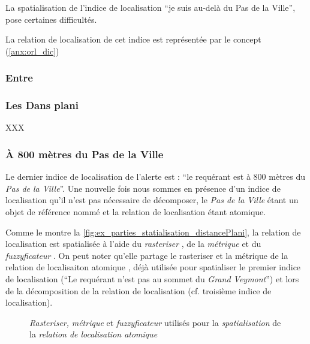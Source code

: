 La spatialisation de l'indice de localisation \enquote{je suis au-delà
  du Pas de la Ville}, pose certaines difficultés.

La relation de localisation de cet indice est représentée par le
concept 
(\autoref{anx:orl_dic})

\subsubsection{Entre}



\subsubsection{Les Dans plani}

XXX





\subsubsection{À 800 mètres du Pas de la Ville}

Le dernier indice de localisation de l'alerte est : \enquote{le
  requérant est à 800 mètres du \emph{Pas de la Ville}}. Une nouvelle
fois nous sommes en présence d'un indice de localisation qu'il n'est
pas nécessaire de décomposer, le \emph{Pas de la Ville} étant un objet
de référence nommé et la relation de localisation
 étant atomique. 

Comme le montre la
\autoref{fig:ex_parties_statialisation_distancePlani}, la relation de
localisation  est
spatialisée à l'aide du \emph{rasteriser} , de
la \emph{métrique}  et du
\emph{fuzzyficateur} . On peut noter qu'elle
partage le rasteriser et la métrique de la relation de localisaiton
atomique , déjà utilisée pour
spatialiser le premier indice de localisation (\enquote{Le requérant
  n'est pas au sommet du \emph{Grand Veymont}}) et lors de la
décomposition de la relation de localisation
 (cf. troisième indice de
localisation).

\begin{figure}
  \centering
  
  \caption{\emph{Rasteriser,} \emph{métrique} et \emph{fuzzyficateur}
    utilisés pour la \emph{spatialisation} de la \emph{relation de
      localisation atomique}
    \protect{}}
  \label{fig:ex_parties_statialisation_distancePlani}
\end{figure}



